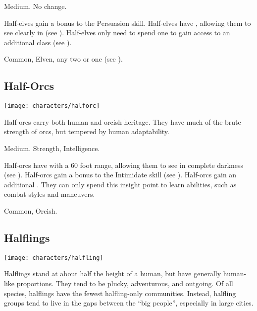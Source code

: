          Medium.
         No change.
        \begin{raggeditemize}
             Half-elves gain a  bonus to the Persuasion skill.
             Half-elves have , allowing them to see clearly in  (see ).
             Half-elves only need to spend one  to gain access to an additional class (see ).
        \end{raggeditemize}
         Common, Elven, any two  or one  (see ).

    \subsection{Half-Orcs}
        \texttt{[image: characters/halforc]}

        Half-orcs carry both human and orcish heritage.
        They have much of the brute strength of orcs, but tempered by human adaptability.

         Medium.
          Strength,  Intelligence.
        \begin{raggeditemize}
             Half-orcs have  with a 60 foot range, allowing them to see in complete darkness (see ).
             Half-orcs gain a  bonus to the Intimidate skill (see ).
             Half-orcs gain an additional .
                They can only spend this insight point to learn  abilities, such as combat styles and maneuvers.
        \end{raggeditemize}
         Common, Orcish.

    \subsection{Halflings}
        \texttt{[image: characters/halfling]}

        Halflings stand at about half the height of a human, but have generally human-like proportions.
        They tend to be plucky, adventurous, and outgoing.
        Of all species, halflings have the fewest halfling-only communities.
        Instead, halfling groups tend to live in the gaps between the ``big people'', especially in large cities.

